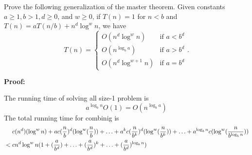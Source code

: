 \documentclass{oxmathproblems}
\begin{document}
\begin{questions}

\makeatletter
\newenvironment{breakablealgorithm}
  {%
   \begin{center}
     \refstepcounter{algorithm}%
     \hrule height.8pt depth0pt \kern2pt%
     \renewcommand{\caption}[2][\relax]{%
       {\raggedright\textbf{\ALG@name~\thealgorithm} ##2\par}%
       \ifx\relax##1\relax %
         \addcontentsline{loa}{algorithm}{\protect\numberline{\thealgorithm}##2}%
       \else %
         \addcontentsline{loa}{algorithm}{\protect\numberline{\thealgorithm}##1}%
       \fi
       \kern2pt\hrule\kern2pt
     }
  }{%
     \kern2pt\hrule\relax%
   \end{center}
  }
\makeatother

\miquestion[25]
Prove the following generalization of the master theorem. Given constants $a\geq 1,b> 1,d\geq 0$, and $w\geq 0$, if $T(n)=1$ for $n<b$ and $T(n) = aT(n/b) + n^d\log^w n$, we have
  $$
    T(n) = \begin{cases}
      O(n^d\log^w n) & \mbox{if }a < b^d \\
      O(n^{\log_b a}) & \mbox{if }a > b^d \\
      O(n^d\log^{w+1} n) & \mbox{if }a = b^d
    \end{cases}.
  $$

\textbf{Proof:}

The running time of solving all size-1 problem is
$$a^{\log_b n}O(1) = O(n^{\log_b a})$$
The total running time for combinig is
\begin{align}
  &\ \ \ \ c(n^d)(\log^w n) + ac(\frac{n}{b})^d(\log^w (\frac{n}{b})) + \ldots + a^kc(\frac{n}{b^k})^d(\log^w (\frac{n}{b^k})) + \ldots + a^{\log_b n}c(\log^w (\frac{n}{b^{\log_b n}})) \notag \\
  &<cn^d\log^w n(1 + (\frac{a}{b^d}) + \ldots + (\frac{a}{b^d})^k + \ldots + (\frac{a}{b^d})^{\log_b n}) \notag
\end{align}
\end{questions}
\end{document}
